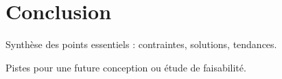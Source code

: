 \chapter{Conclusion}\label{SEC:Conclusion}


Synthèse des points essentiels : contraintes, solutions, tendances.

Pistes pour une future conception ou étude de faisabilité.
